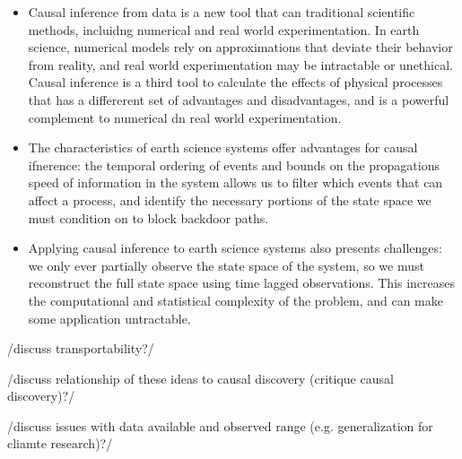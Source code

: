 \documentclass[12pt]{article}
\begin{document}
\begin{itemize}
\item Causal inference from data is a new tool that can traditional
  scientific methods, incluidng numerical and real world
  experimentation. In earth science, numerical models rely on
  approximations that deviate their behavior from reality, and real
  world experimentation may be intractable or unethical. Causal
  inference is a third tool to calculate the effects of physical
  processes that has a differerent set of advantages and
  disadvantages, and is a powerful complement to numerical dn real
  world experimentation.
\item The characteristics of earth science systems offer advantages
  for causal ifnerence: the temporal ordering of events and bounds on
  the propagations speed of information in the system allows us to
  filter which events that can affect a process, and identify the
  necessary portions of the state space we must condition on to block
  backdoor paths.
\item Applying causal inference to earth science systems also presents
  challenges: we only ever partially observe the state space of the
  system, so we must reconstruct the full state space using time
  lagged observations. This increases the computational and
  statistical complexity of the problem, and can make some application
  untractable.
\end{itemize}

/discuss transportability?/

/discuss relationship of these ideas to causal discovery (critique
causal discovery)?/

/discuss issues with data available and observed range
(e.g. generalization for cliamte research)?/


\end{document}
